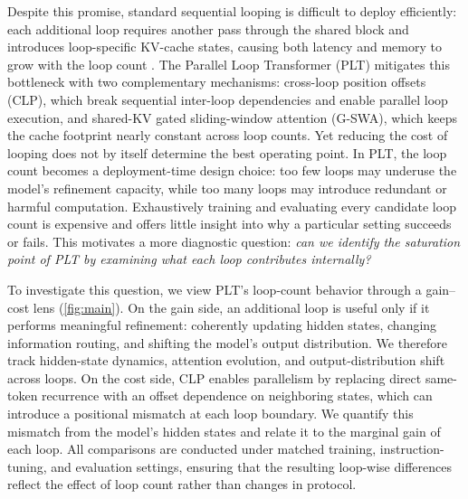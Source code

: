 \documentclass{llmxive}
\begin{document}
Despite this promise, standard sequential looping is difficult to deploy efficiently: each additional loop requires another pass through the shared block and introduces loop-specific KV-cache states, causing both latency and memory to grow with the loop count \citep{vendrell2026memoryefficient}. The Parallel Loop Transformer (PLT) \citep{wu2025parallel} mitigates this bottleneck with two complementary mechanisms: cross-loop position offsets (CLP), which break sequential inter-loop dependencies and enable parallel loop execution, and shared-KV gated sliding-window attention (G-SWA), which keeps the cache footprint nearly constant across loop counts. Yet reducing the cost of looping does not by itself determine the best operating point. In PLT, the loop count becomes a deployment-time design choice: too few loops may underuse the model's refinement capacity, while too many loops may introduce redundant or harmful computation. Exhaustively training and evaluating every candidate loop count is expensive and offers little insight into why a particular setting succeeds or fails. This motivates a more diagnostic question: \emph{can we identify the saturation point of PLT by examining what each loop contributes internally?}


To investigate this question, we view PLT's loop-count behavior through a gain--cost lens (\autoref{fig:main}). On the gain side, an additional loop is useful only if it performs meaningful refinement: coherently updating hidden states, changing information routing, and shifting the model's output distribution. We therefore track hidden-state dynamics, attention evolution, and output-distribution shift across loops. On the cost side, CLP enables parallelism by replacing direct same-token recurrence with an offset dependence on neighboring states, which can introduce a positional mismatch at each loop boundary. We quantify this mismatch from the model's hidden states and relate it to the marginal gain of each loop. All comparisons are conducted under matched training, instruction-tuning, and evaluation settings, ensuring that the resulting loop-wise differences reflect the effect of loop count rather than changes in protocol.

\end{document}
